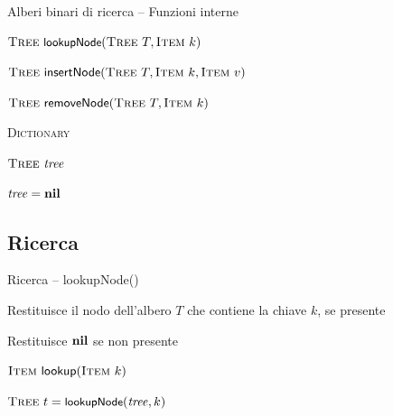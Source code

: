 \begin{frame}{Alberi binari di ricerca -- Funzioni interne}

\BIL
\item \alert{$\Tree\ \lookupnode(\Tree\ T, \Item\ k)$}
\item \alert{$\Tree\ \textsf{insertNode}(\Tree\ T, \Item\ k, \Item\ v)$}
\item \alert{$\Tree\ \textsf{removeNode}(\Tree\ T, \Item\ k)$}
\EIL

\begin{Procedure}
\caption{\textsc{Dictionary}}

$\textsc{Tree}\ \mathit{tree}$\;

\BlankLine
{}
{
  $\mathit{tree} = \textbf{nil}$\;
}



\end{Procedure}

\end{frame}



\subsection{Ricerca}

\begin{frame}{Ricerca -- \textsf{lookupNode}()}

\begin{myboxtitle}
\BIL
\item Restituisce il nodo dell'albero $T$ che contiene la chiave $k$, se presente
\item Restituisce $\textbf{nil}$ se non presente
\EIL
\end{myboxtitle}

\begin{myboxtitle}
\vspace{-12pt}
\begin{Procedure}
\caption[A]{$\Item\ \textsf{lookup}(\Item\ k)$}
$\textsc{Tree}\ t = \textsf{{\small lookupNode}}(\mathit{tree}, k)$\;
\end{Procedure}
\vspace{-12pt}
\end{myboxtitle}

\end{frame}


